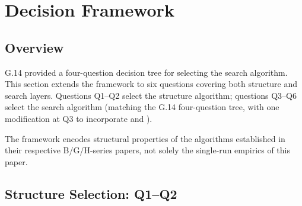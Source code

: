 \section{Decision Framework}
\label{sec:decision}

\subsection{Overview}

G.14 provided a four-question decision tree for selecting the search algorithm.
This section extends the framework to six questions covering both structure and
search layers.
Questions Q1--Q2 select the structure algorithm; questions Q3--Q6 select the
search algorithm (matching the G.14 four-question tree, with one modification
at Q3 to incorporate \pt{} and \ams{}).

The framework encodes structural properties of the algorithms established in
their respective B/G/H-series papers, not solely the single-run empirics of
this paper.

\subsection{Structure Selection: Q1--Q2}

